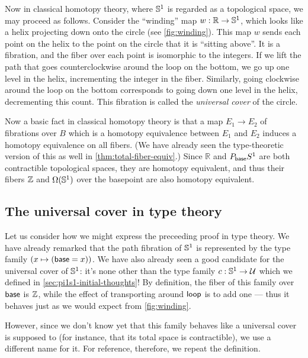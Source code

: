 Now in classical homotopy theory, where $\mathbb{S}^1$ is regarded as a topological space, we may proceed as follows.
%
Consider the ``winding'' map $w:\mathbb{R}\to \mathbb{S} ^1$, which looks like a helix projecting down onto the circle (see \autoref{fig:winding}).
This map $w$ sends each point on the helix to the point on the circle that it is ``sitting above''.
It is a fibration, and the fiber over each point is isomorphic to the integers.
If we lift the path that goes counterclockwise around the loop on the bottom, we go up one level in the helix, incrementing the integer in the fiber.
Similarly, going clockwise around the loop on the bottom corresponds to going down one level in the helix, decrementing this count.
This fibration is called the \emph{universal cover} of the circle.
%
%
%

Now a basic fact in classical homotopy theory is that a map $E_1\to E_2$ of fibrations over $B$ which is a homotopy equivalence between $E_1$ and $E_2$ induces a homotopy equivalence on all fibers.
(We have already seen the type-theoretic version of this as well in \autoref{thm:total-fiber-equiv}.)
Since $\mathbb{R}$ and $P_{\mathsf{base}} S^1$ are both contractible topological spaces, they are homotopy equivalent, and thus their fibers $\mathbb{Z}$ and $\Omega(\mathbb{S} ^1)$ over the basepoint are also homotopy equivalent.

%

\subsection{The universal cover in type theory}
\label{sec:pi1s1-universal-cover}

%
%
%

Let us consider how we might express the preceeding proof in type theory.
We have already remarked that the path fibration of $\mathbb{S}^1$ is represented by the type family $(x\mapsto (\mathsf{base}=x))$.
We have also already seen a good candidate for the universal cover of $\mathbb{S}^1$: it's none other than the type family $c:\mathbb{S}^1\to\mathcal{U}$ which we defined in \autoref{sec:pi1s1-initial-thoughts}!
By definition, the fiber of this family over $\mathsf{base}$ is $\mathbb{Z}$, while the effect of transporting around $\mathsf{loop}$ is to add one --- thus it behaves just as we would expect from \autoref{fig:winding}.

However, since we don't know yet that this family behaves like a universal cover is supposed to (for instance, that its total space is contractible), we use a different name for it.
For reference, therefore, we repeat the definition.

